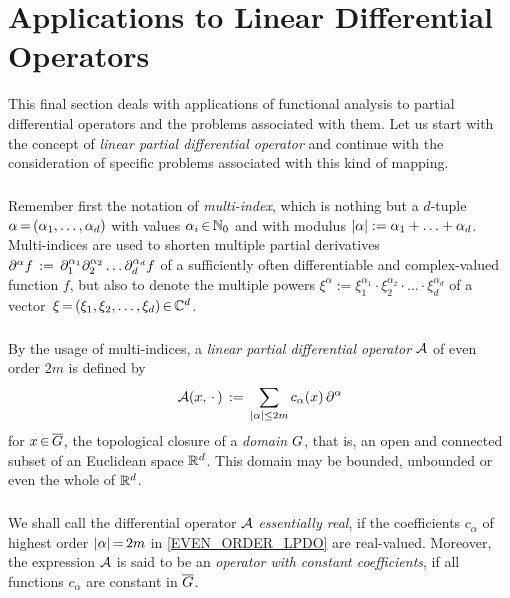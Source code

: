 \documentclass[11pt,twoside]{article}
\begin{document}
\section{Applications to Linear Differential Operators}                        %
This final section deals with applications of functional analysis
to partial differential operators and the problems associated with them.
Let us start with the concept of \textit{linear partial differential operator}
and continue with the consideration of specific problems
associated with this kind of mapping.

\subparagraph{} %
Remember first the notation of \textit{multi-index},
which is nothing but a $d$-tuple $\alpha {\,=\,} (\alpha_1,\ldots,\alpha_d)$
with values $\alpha_i {\,\in\,} {\mathbb{N}}_0$
and with modulus $\abs{\alpha} := \alpha_1 + \ldots + \alpha_d$.
Multi-indices are used to shorten multiple partial derivatives
$
\partial^{\alpha} f \,:=\, \partial_1^{\alpha_1}
             \partial_2^{\alpha_2} \ldots
             \partial_d^{\alpha_d} f
$
of a sufficiently often differentiable and complex-valued function $f$,
but also to denote the multiple powers
$\xi^{\alpha} := \xi_1^{\alpha_1}
\cdot \xi_2^{\alpha_2} \cdot \ldots \cdot \xi_d^{\alpha_d}$
of a vector $\,\xi {\,=\,} (\xi_1,\xi_2,\ldots,\xi_d) {\,\in\,} {\mathbb{C}}^d$.

\subparagraph{} %
By the usage of multi-indices,
a \textit{linear partial differential operator} ${\mathcal{A}}$ of even order $2m$
is defined by
\begin{equation}\label{EVEN_ORDER_LPDO}
\A(x,\,\cdot\,) \eqdef
\sum_{\abs{\alpha} \leq 2m} c_{\alpha}(x) \, \PA
\end{equation}
for $x {\,\in\,} \overline{G}$,
the topological closure of a \textit{domain} $G$,
that is,
an open and connected subset of an Euclidean space ${\mathbb{R}}^d$.
This domain may be bounded, unbounded or even the whole of ${\mathbb{R}}^d$.

\subparagraph{} %
We shall call the differential operator ${\mathcal{A}}$ \textit{essentially real},
if the coefficients $c_{\alpha}$ of highest order $\abs{\alpha} \eq 2m$
in \eqref{EVEN_ORDER_LPDO} are real-valued.
Moreover,
the expression ${\mathcal{A}}$ is said to be
an \textit{operator with constant coefficients},
if all functions $c_{\alpha}$ are constant in $\overline{G}$.
\end{document}
